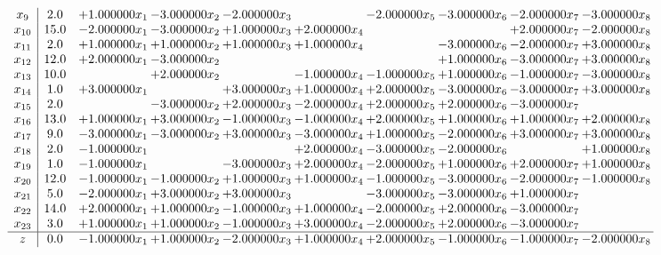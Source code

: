 \documentclass[10pt]{article}
\begin{document}
\[\begin{array}{c| c c@{\hskip 2pt} c@{\hskip 2pt} c@{\hskip 2pt} c@{\hskip 2pt} c@{\hskip 2pt} c@{\hskip 2pt} c@{\hskip 2pt} c@{\hskip 2pt} }
 x_{9}   &  2.0 & + 1.000000 x_{1} & -3.000000 x_{2} & -2.000000 x_{3} &   & -2.000000 x_{5} & -3.000000 x_{6} & -2.000000 x_{7} & -3.000000 x_{8}\\
 x_{10}   &  15.0 & -2.000000 x_{1} & -3.000000 x_{2} & + 1.000000 x_{3} & + 2.000000 x_{4} &    &   & + 2.000000 x_{7} & -2.000000 x_{8}\\
 x_{11}   &  2.0 & + 1.000000 x_{1} & + 1.000000 x_{2} & + 1.000000 x_{3} & + 1.000000 x_{4} &   & -3.000000 x_{6} & -2.000000 x_{7} & + 3.000000 x_{8}\\
 x_{12}   &  12.0 & + 2.000000 x_{1} & -3.000000 x_{2} &    &    &   & + 1.000000 x_{6} & -3.000000 x_{7} & + 3.000000 x_{8}\\
 x_{13}   &  10.0  &   & + 2.000000 x_{2} &   & -1.000000 x_{4} & -1.000000 x_{5} & + 1.000000 x_{6} & -1.000000 x_{7} & -3.000000 x_{8}\\
 x_{14}   &  1.0 & + 3.000000 x_{1} &   & + 3.000000 x_{3} & + 1.000000 x_{4} & + 2.000000 x_{5} & -3.000000 x_{6} & -3.000000 x_{7} & + 3.000000 x_{8}\\
 x_{15}   &  2.0  &   & -3.000000 x_{2} & + 2.000000 x_{3} & -2.000000 x_{4} & + 2.000000 x_{5} & + 2.000000 x_{6} & -3.000000 x_{7} &   \\
 x_{16}   &  13.0 & + 1.000000 x_{1} & + 3.000000 x_{2} & -1.000000 x_{3} & -1.000000 x_{4} & + 2.000000 x_{5} & + 1.000000 x_{6} & + 1.000000 x_{7} & + 2.000000 x_{8}\\
 x_{17}   &  9.0 & -3.000000 x_{1} & -3.000000 x_{2} & + 3.000000 x_{3} & -3.000000 x_{4} & + 1.000000 x_{5} & -2.000000 x_{6} & + 3.000000 x_{7} & + 3.000000 x_{8}\\
 x_{18}   &  2.0 & -1.000000 x_{1} &    &   & + 2.000000 x_{4} & -3.000000 x_{5} & -2.000000 x_{6} &   & + 1.000000 x_{8}\\
 x_{19}   &  1.0 & -1.000000 x_{1} &   & -3.000000 x_{3} & + 2.000000 x_{4} & -2.000000 x_{5} & + 1.000000 x_{6} & + 2.000000 x_{7} & + 1.000000 x_{8}\\
 x_{20}   &  12.0 & -1.000000 x_{1} & -1.000000 x_{2} & + 1.000000 x_{3} & + 1.000000 x_{4} & -1.000000 x_{5} & -3.000000 x_{6} & -2.000000 x_{7} & -1.000000 x_{8}\\
 x_{21}   &  5.0 & -2.000000 x_{1} & + 3.000000 x_{2} & + 3.000000 x_{3} &   & -3.000000 x_{5} & -3.000000 x_{6} & + 1.000000 x_{7} &   \\
 x_{22}   &  14.0 & + 2.000000 x_{1} & + 1.000000 x_{2} & -1.000000 x_{3} & + 1.000000 x_{4} & -2.000000 x_{5} & + 2.000000 x_{6} & -3.000000 x_{7} &   \\
 x_{23}   &  3.0 & + 1.000000 x_{1} & + 1.000000 x_{2} & -1.000000 x_{3} & + 3.000000 x_{4} & -2.000000 x_{5} & + 2.000000 x_{6} & -3.000000 x_{7} &   \\
\hline
z    &  0.0 & -1.000000 x_{1} & + 1.000000 x_{2} & -2.000000 x_{3} & + 1.000000 x_{4} & + 2.000000 x_{5} & -1.000000 x_{6} & -1.000000 x_{7} & -2.000000 x_{8}\\
\end{array}\]
\end{document}
